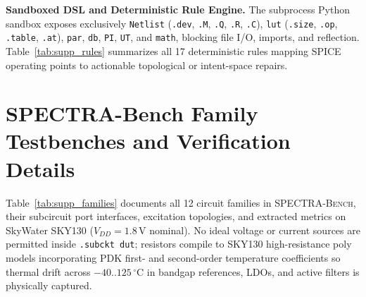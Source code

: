 \textbf{Sandboxed DSL and Deterministic Rule Engine.} The subprocess Python sandbox exposes exclusively \texttt{Netlist} (\texttt{.dev}, \texttt{.M}, \texttt{.Q}, \texttt{.R}, \texttt{.C}), \texttt{lut} (\texttt{.size}, \texttt{.op}, \texttt{.table}, \texttt{.at}), \texttt{par}, \texttt{db}, \texttt{PI}, \texttt{UT}, and \texttt{math}, blocking file I/O, imports, and reflection. Table~\ref{tab:supp_rules} summarizes all 17 deterministic rules mapping SPICE operating points to actionable topological or intent-space repairs.

\section{SPECTRA-Bench Family Testbenches and Verification Details}
\label{app:bench}

Table~\ref{tab:supp_families} documents all 12 circuit families in \textsc{SPECTRA-Bench}, their subcircuit port interfaces, excitation topologies, and extracted metrics on SkyWater SKY130 ($V_{DD}=1.8\,\mathrm{V}$ nominal). No ideal voltage or current sources are permitted inside \texttt{.subckt dut}; resistors compile to SKY130 high-resistance poly models incorporating PDK first- and second-order temperature coefficients so thermal drift across $-40..125\,^\circ\mathrm{C}$ in bandgap references, LDOs, and active filters is physically captured.

